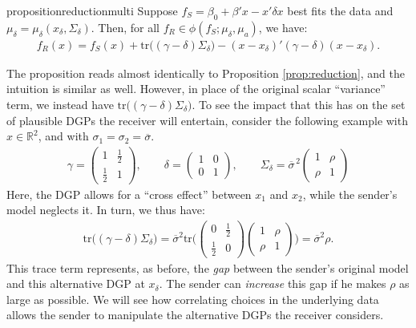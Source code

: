 \documentclass[11pt,dvipsnames]{article}
\newcommand{\trace}{\mathrm{tr}}
\begin{document}
\begin{restatable}{proposition}{reductionmulti}
\label{prop:reductionmulti}
Suppose $f_S = \beta_0+\beta'x-x'\delta x$ best fits the data and $\mu_\delta = \mu_\delta(x_\delta,\Sigma_\delta)$. Then, for all $f_R \in \phi(f_S;\mu_\delta,\mu_a)$, we have:
\begin{align*}
f_R(x) = f_S(x)+\trace\big((\gamma-\delta)\Sigma_\delta\big)-(x-x_\delta)'(\gamma-\delta)(x-x_\delta).
\end{align*}
\end{restatable}
The proposition reads almost identically to Proposition \ref{prop:reduction}, and the intuition is similar as well.
However, in place of the original scalar ``variance'' term, we instead have $\trace\big((\gamma-\delta)\Sigma_\delta\big)$.
To see the impact that this has on the set of plausible DGPs the receiver will entertain, consider the following example with $x \in \mathbb{R}^2$, and with $\sigma_1 = \sigma_2 = \overline{\sigma}$.
\begin{align*}
\gamma = \begin{pmatrix} 1 & \frac{1}{2} \\ \frac{1}{2} & 1 \end{pmatrix},
\qquad
\delta = \begin{pmatrix} 1 & 0 \\ 0 & 1 \end{pmatrix},
\qquad
\Sigma_\delta = \overline{\sigma}^{\,2}\begin{pmatrix} 1 & \rho \\ \rho & 1 \end{pmatrix}
\end{align*}
Here, the DGP allows for a ``cross effect'' between $x_1$ and $x_2$, while the sender's model neglects it. In turn, we thus have:
\begin{align*}
\trace\big((\gamma-\delta)\Sigma_\delta\big)
=\overline{\sigma}^2\trace\bigg(\begin{pmatrix} 0 & \frac{1}{2} \\ \frac{1}{2} & 0 \end{pmatrix}\begin{pmatrix} 1 & \rho \\ \rho & 1 \end{pmatrix}\bigg)
=\overline{\sigma}^2\rho.
\end{align*}
This trace term represents, as before, the \emph{gap} between the sender's original model and this alternative DGP at $x_\delta$. The sender can \emph{increase} this gap if he makes $\rho$ as large as possible.
We will see how correlating choices in the underlying data allows the sender to manipulate the alternative DGPs the receiver considers.
\end{document}
